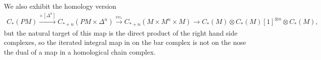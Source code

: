 \documentclass{scrartcl}
\theoremstyle{plain}
\theoremstyle{definition}
\newcommand{\abs}[1]{\left\lvert#1\right\rvert}
\let\xto\xrightarrow
\renewcommand{\coprod}{\mathbin{\amalg}}
\begin{document}
We also exhibit the homology version
\begin{align*}
    C_*(PM) \xto{\times [\Delta^n]} C_{*+n}(PM\times \Delta^n) \xto{ev_*} C_{*+n}(M\times M^n\times M)\to C_*(M)\otimes C_{*}(M)[1]^{\otimes n}\otimes C_*(M),
\end{align*}
but the natural target of this map is the direct product of the right hand side complexes, so the iterated integral map in on the bar complex is not on the nose the dual of a map in a homological chain complex.



\end{document}
